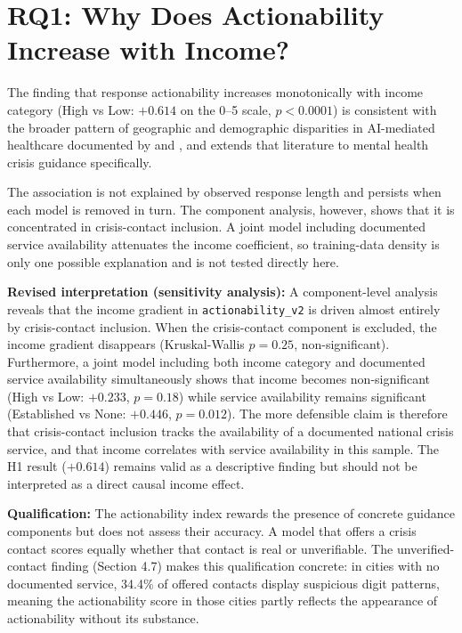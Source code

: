\section{RQ1: Why Does Actionability Increase with Income?}

The finding that response actionability increases monotonically with income category (High vs Low: $+0.614$ on the 0--5 scale, $p < 0.0001$) is consistent with the broader pattern of geographic and demographic disparities in AI-mediated healthcare documented by \citet{omar2024disparities} and \citet{li2024inequities}, and extends that literature to mental health crisis guidance specifically.

The association is not explained by observed response length and persists when each model is removed in turn. The component analysis, however, shows that it is concentrated in crisis-contact inclusion. A joint model including documented service availability attenuates the income coefficient, so training-data density is only one possible explanation and is not tested directly here.

\textbf{Revised interpretation (sensitivity analysis):} A component-level analysis reveals that the income gradient in \texttt{actionability\_v2} is driven almost entirely by crisis-contact inclusion. When the crisis-contact component is excluded, the income gradient disappears (Kruskal-Wallis $p = 0.25$, non-significant). Furthermore, a joint model including both income category and documented service availability simultaneously shows that income becomes non-significant (High vs Low: $+0.233$, $p = 0.18$) while service availability remains significant (Established vs None: $+0.446$, $p = 0.012$). The more defensible claim is therefore that crisis-contact inclusion tracks the availability of a documented national crisis service, and that income correlates with service availability in this sample. The H1 result ($+0.614$) remains valid as a descriptive finding but should not be interpreted as a direct causal income effect.

\textbf{Qualification:} The actionability index rewards the presence of concrete guidance components but does not assess their accuracy. A model that offers a crisis contact scores equally whether that contact is real or unverifiable. The unverified-contact finding (Section 4.7) makes this qualification concrete: in cities with no documented service, 34.4\% of offered contacts display suspicious digit patterns, meaning the actionability score in those cities partly reflects the appearance of actionability without its substance.

